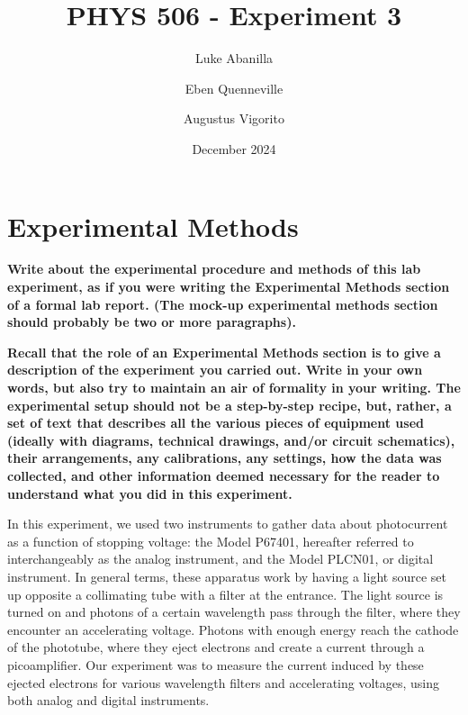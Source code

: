 \documentclass[prX,nofootinbib,notitlepage]{revtex4-1}
\begin{document}


\title{PHYS 506 - Experiment 3}

\author{Luke Abanilla}%
\author{Eben Quenneville}
\author{Augustus Vigorito}
\date{December 2024}

\maketitle
\vspace{-8cm}

\section{Experimental Methods}

\textbf{Write about the experimental procedure and methods of this lab experiment, as if you were writing the Experimental Methods section of a formal lab report. (The mock-up experimental methods section should probably be two or more paragraphs).}

\textbf{Recall that the role of an Experimental Methods section is to give a description of the experiment you carried out. Write in your own words, but also try to maintain an air of formality in your writing. The experimental setup should not be a step-by-step recipe, but, rather, a set of text that describes all the various pieces of equipment used (ideally with diagrams, technical drawings, and/or circuit schematics), their arrangements, any calibrations, any settings, how the data was collected, and other information deemed necessary for the reader to understand what you did in this experiment.}

In this experiment, we used two instruments to gather data about photocurrent as a function of stopping voltage: the Model P67401, hereafter referred to interchangeably as the analog instrument, and the Model PLCN01, or digital instrument. In general terms, these apparatus work by having a light source set up opposite a collimating tube with a filter at the entrance. The light source is turned on and photons of a certain wavelength pass through the filter, where they encounter an accelerating voltage. Photons with enough energy reach the cathode of the phototube, where they eject electrons and create a current through a picoamplifier. Our experiment was to measure the current induced by these ejected electrons for various wavelength filters and accelerating voltages, using both analog and digital instruments.
\end{document}
